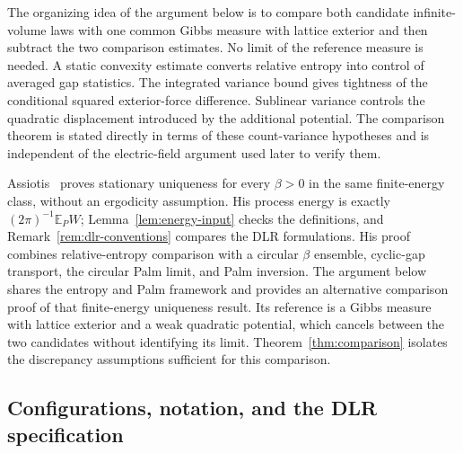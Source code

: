 \documentclass[11pt,reqno]{amsart}
\numberwithin{equation}{section}
\theoremstyle{definition}
\theoremstyle{remark}
\newcommand{\E}{\mathbb E}
\newcommand{\1}{\mathbf 1}
\begin{document}
The organizing idea of the argument below is to compare both candidate
infinite-volume laws with one common Gibbs measure with lattice exterior and then
subtract the two comparison estimates. No limit of the reference measure is needed. A static
convexity estimate converts relative entropy into control of averaged
gap statistics. The integrated variance bound gives tightness of the conditional squared
exterior-force difference. Sublinear variance controls the quadratic
displacement introduced by the additional potential. The comparison theorem is stated directly in terms of
these count-variance hypotheses and is independent of the electric-field
argument used later to verify them.

Assiotis~\cite[Theorem~1.1]{Assiotis} proves stationary uniqueness for
every $\beta>0$ in the same finite-energy class, without an ergodicity
assumption. His process energy is exactly $(2\pi)^{-1}\E_PW$;
Lemma~\ref{lem:energy-input} checks the definitions, and
Remark~\ref{rem:dlr-conventions} compares the DLR formulations.
His proof combines relative-entropy comparison with a circular
$\beta$ ensemble, cyclic-gap transport, the circular Palm limit,
and Palm inversion. The argument below shares the entropy and Palm
framework and provides an alternative comparison proof of that
finite-energy uniqueness result. Its reference is a Gibbs measure with lattice exterior
and a weak quadratic potential, which cancels between the two
candidates without identifying its limit. Theorem~\ref{thm:comparison}
isolates the discrepancy assumptions sufficient for this comparison.

\subsection{Configurations, notation, and the DLR specification}
\label{subsec:notation}
\end{document}
